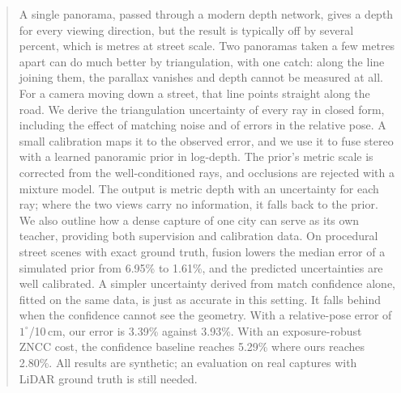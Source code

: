 \begin{abstract}
A single panorama, passed through a modern depth network, gives a depth for every viewing direction,
but the result is typically off by several percent, which is metres at street scale. Two panoramas
taken a few metres apart can do much better by triangulation, with one catch: along the line joining
them, the parallax vanishes and depth cannot be measured at all. For a camera moving down a street,
that line points straight along the road. We derive the triangulation uncertainty of every ray in
closed form, including the effect of matching noise and of errors in the relative pose. A small
calibration maps it to the observed error, and we use it to fuse stereo with a learned panoramic prior
in log-depth. The prior's metric scale is corrected from the well-conditioned rays, and occlusions are
rejected with a mixture model. The output is metric depth with an uncertainty for each ray; where the
two views carry no information, it falls back to the prior. We also outline how a dense capture of one
city can serve as its own teacher, providing both supervision and calibration data. On procedural
street scenes with exact ground truth, fusion lowers the median error of a simulated prior from 6.95\%
to 1.61\%, and the predicted uncertainties are well calibrated. A simpler uncertainty derived from match
confidence alone, fitted on the same data, is just as accurate in this setting. It falls behind when
the confidence cannot see the geometry. With a relative-pose error of $1^\circ$/10\,cm, our error is
3.39\% against 3.93\%. With an exposure-robust ZNCC cost, the confidence baseline reaches 5.29\% where
ours reaches 2.80\%. All results are synthetic; an evaluation on real captures with LiDAR ground
truth is still needed.
\end{abstract}

